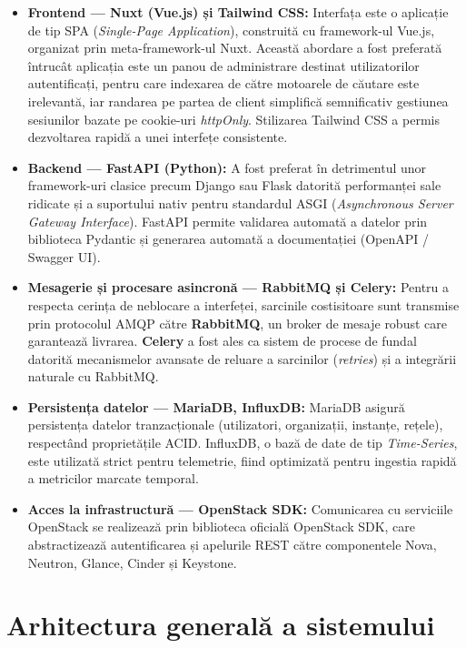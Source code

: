 \begin{itemize}
    \item \textbf{Frontend --- Nuxt (Vue.js) și Tailwind CSS:} Interfața este o aplicație de tip SPA (\textit{Single-Page Application}), construită cu framework-ul Vue.js, organizat prin meta-framework-ul Nuxt. Această abordare a fost preferată întrucât aplicația este un panou de administrare destinat utilizatorilor autentificați, pentru care indexarea de către motoarele de căutare este irelevantă, iar randarea pe partea de client simplifică semnificativ gestiunea sesiunilor bazate pe cookie-uri \textit{httpOnly}. Stilizarea Tailwind CSS a permis dezvoltarea rapidă a unei interfețe consistente.
    \item \textbf{Backend --- FastAPI (Python):} A fost preferat în detrimentul unor framework-uri clasice precum Django sau Flask datorită performanței sale ridicate și a suportului nativ pentru standardul ASGI (\textit{Asynchronous Server Gateway Interface}). FastAPI permite validarea automată a datelor prin biblioteca Pydantic și generarea automată a documentației (OpenAPI / Swagger UI).
    \item \textbf{Mesagerie și procesare asincronă --- RabbitMQ și Celery:} Pentru a respecta cerința de neblocare a interfeței, sarcinile costisitoare sunt transmise prin protocolul AMQP către \textbf{RabbitMQ}, un broker de mesaje robust care garantează livrarea. \textbf{Celery} a fost ales ca sistem de procese de fundal datorită mecanismelor avansate de reluare a sarcinilor (\textit{retries}) și a integrării naturale cu RabbitMQ.
    \item \textbf{Persistența datelor --- MariaDB, InfluxDB:} MariaDB asigură persistența datelor tranzacționale (utilizatori, organizații, instanțe, rețele), respectând proprietățile ACID. InfluxDB, o bază de date de tip \textit{Time-Series}, este utilizată strict pentru telemetrie, fiind optimizată pentru ingestia rapidă a metricilor marcate temporal.
    \item \textbf{Acces la infrastructură --- OpenStack SDK:} Comunicarea cu serviciile OpenStack se realizează prin biblioteca oficială OpenStack SDK, care abstractizează autentificarea și apelurile REST către componentele Nova, Neutron, Glance, Cinder și Keystone.
\end{itemize}

\section{Arhitectura generală a sistemului}
\label{sec:cap3_arhitectura}

